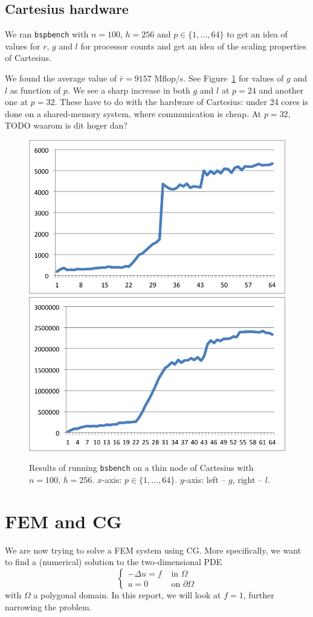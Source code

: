 \documentclass[11pt]{amsart}
\theoremstyle{definition}
\begin{document}
\subsection{Cartesius hardware}
\label{sec:cart}
We ran \texttt{bspbench} with $n=100$, $h=256$ and $p \in \{1, \ldots, 64\}$ to get an idea of values for $r$, $g$ and $l$ for processor counts and get an idea of the scaling properties of Cartesius.

We found the average value of $\bar r = 9157$ Mflop/s. See Figure~\ref{fig:cart} for values of $g$ and $l$ as function of $p$. We see a sharp increase in both $g$ and $l$ at $p=24$ and another one at $p=32$. These have to do with the hardware of Cartesius: under 24 cores is done on a shared-memory system, where communication is cheap. At $p=32$, TODO waarom is dit hoger dan?

\begin{figure}
  \includegraphics[width=0.49\linewidth]{cartg.png}
  \includegraphics[width=0.49\linewidth]{cartl.png}
  \caption{Results of running \texttt{bsbench} on a thin node of Cartesius with $n=100$, $h=256$. $x$-axis: $p \in \{1, \ldots, 64\}$. $y$-axis: left -- $g$, right -- $l$.}
  \label{fig:cart}
\end{figure}

\section{FEM and CG}
We are now trying to solve a FEM system using CG. More specifically, we want to find a (numerical) solution to the two-dimensional PDE
\begin{equation}
  \label{eqn:fem}
  \begin{cases} -\Delta u = f & \text{ in } \Omega \\ u = 0 & \text{ on } \partial \Omega \end{cases}
\end{equation}
with $\Omega$ a polygonal domain. In this report, we will look at $f=1$, further narrowing the problem.
\end{document}

